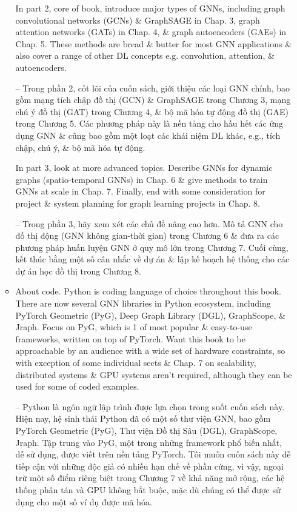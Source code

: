 \documentclass{article}
\begin{document}
\begin{itemize}
\begin{itemize}
        In part 2, core of book, introduce major types of GNNs, including graph convolutional networks (GCNs) \& GraphSAGE in Chap. 3, graph attention networks (GATs) in Chap. 4, \& graph autoencoders (GAEs) in Chap. 5. These methods are bread \& butter for most GNN applications \& also cover a range of other DL concepts e.g. convolution, attention, \& autoencoders.

        -- Trong phần 2, cốt lõi của cuốn sách, giới thiệu các loại GNN chính, bao gồm mạng tích chập đồ thị (GCN) \& GraphSAGE trong Chương 3, mạng chú ý đồ thị (GAT) trong Chương 4, \& bộ mã hóa tự động đồ thị (GAE) trong Chương 5. Các phương pháp này là nền tảng cho hầu hết các ứng dụng GNN \& cũng bao gồm một loạt các khái niệm DL khác, e.g., tích chập, chú ý, \& bộ mã hóa tự động.

        In part 3, look at more advanced topics. Describe GNNs for dynamic graphs (spatio-temporal GNNs) in Chap. 6 \& give methods to train GNNs at scale in Chap. 7. Finally, end with some consideration for project \& system planning for graph learning projects in Chap. 8.

        -- Trong phần 3, hãy xem xét các chủ đề nâng cao hơn. Mô tả GNN cho đồ thị động (GNN không gian-thời gian) trong Chương 6 \& đưa ra các phương pháp huấn luyện GNN ở quy mô lớn trong Chương 7. Cuối cùng, kết thúc bằng một số cân nhắc về dự án \& lập kế hoạch hệ thống cho các dự án học đồ thị trong Chương 8.
        \item {\sf About code.} Python is coding language of choice throughout this book. There are now several GNN libraries in Python ecosystem, including PyTorch Geometric (PyG), Deep Graph Library (DGL), GraphScope, \& Jraph. Focus on PyG, which is 1 of most popular \& easy-to-use frameworks, written on top of PyTorch. Want this book to be approachable by an audience with a wide set of hardware constraints, so with exception of some individual sects \& Chap. 7 on scalability, distributed systems \& GPU systems aren't required, although they can be used for some of coded examples.

        -- Python là ngôn ngữ lập trình được lựa chọn trong suốt cuốn sách này. Hiện nay, hệ sinh thái Python đã có một số thư viện GNN, bao gồm PyTorch Geometric (PyG), Thư viện Đồ thị Sâu (DGL), GraphScope, Jraph. Tập trung vào PyG, một trong những framework phổ biến nhất, dễ sử dụng, được viết trên nền tảng PyTorch. Tôi muốn cuốn sách này dễ tiếp cận với những độc giả có nhiều hạn chế về phần cứng, vì vậy, ngoại trừ một số điểm riêng biệt trong Chương 7 về khả năng mở rộng, các hệ thống phân tán và GPU không bắt buộc, mặc dù chúng có thể được sử dụng cho một số ví dụ được mã hóa.


\end{itemize}
\end{itemize}
\end{document}
